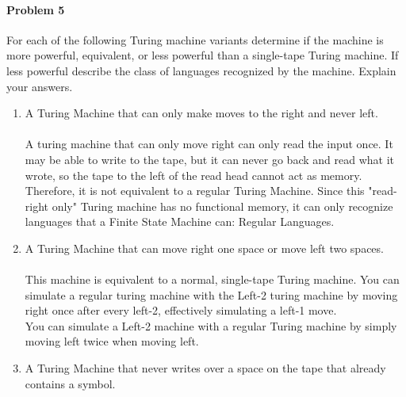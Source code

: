 \documentclass{article}
\begin{document}
    


\paragraph{Problem 5} For each of the following Turing machine variants determine if the machine
is more powerful, equivalent, or less powerful than a single-tape Turing machine. If less powerful
describe the class of languages recognized by the machine. Explain your answers.
\begin{enumerate}[\indent a)]
    \item A Turing Machine that can only make moves to the right and never left.
	\paragraph{} A turing machine that can only move right can only read the input once. It may be able to write to the tape, but it can never go back and read what it wrote, so the tape to the left of the read head cannot act as memory. Therefore, it is not equivalent to a regular Turing Machine. Since this "read-right only" Turing machine has no functional memory, it can only recognize languages that a Finite State Machine can: Regular Languages.
    
    \item A Turing Machine that can move right one space or move left two spaces.
    \paragraph{} This machine is equivalent to a normal, single-tape Turing machine. You can simulate
    a regular turing machine with the Left-2 turing machine by moving right once after every left-2, effectively 
    simulating a left-1 move.
    \\You can simulate a Left-2 machine with a regular Turing machine by simply moving left twice when moving left.
    \item A Turing Machine that never writes over a space on the tape that already contains a symbol.

\end{enumerate}
\end{document}
